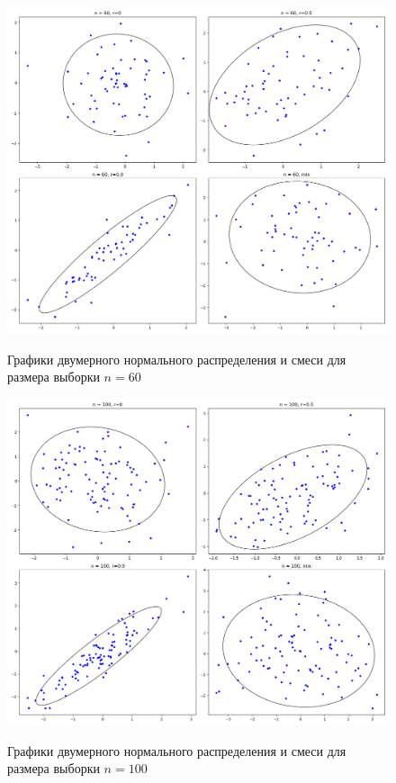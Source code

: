 \documentclass[a4]{article}
\begin{document}
\vspace{-10cm}
\begin{figure}[H]
	\centering
	\caption{Графики двумерного нормального распределения и смеси для размера выборки $ n =60 $ }
	\includegraphics[scale = 0.5]{ellipse_n=60.png}
	\label{fig:dis_norm_gis1}
\end{figure}

\vspace{-1cm}
\begin{figure}[H]
	\centering
	\caption{Графики двумерного нормального распределения и смеси для размера выборки $ n =100 $ }
	\includegraphics[scale = 0.5]{ellipse_n=100.png} 
	\label{fig:dis_norm_gis2}
\end{figure}
\end{document}
